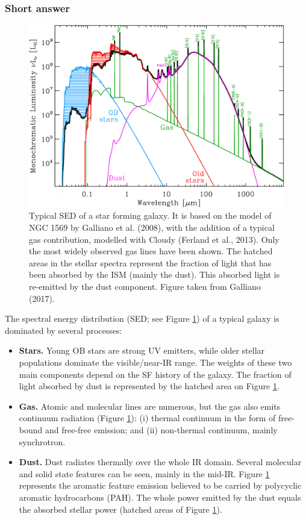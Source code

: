 \documentclass[a4paper,10pt]{article}
\begin{document}
\subsubsection{Short answer}

\begin{figure}[h]
    \centering
    \includegraphics[width=14cm]{figures/GalaxySED.jpg}
    \caption{\footnotesize{Typical SED of a star forming galaxy. It is based on the model of NGC 1569 by Galliano et al. (2008), with the addition of a typical gas contribution, modelled with Cloudy (Ferland et al., 2013). Only the most widely observed gas lines have been shown. The hatched areas in the stellar spectra represent the fraction of light that has been absorbed by the ISM (mainly the dust). This absorbed light is re-emitted by the dust component. Figure taken from Galliano (2017).}}
    \label{fig:galaxySED}
\end{figure}

{\noindent}The spectral energy distribution (SED; see Figure \ref{fig:galaxySED}) of a typical galaxy is dominated by several processes:

\begin{itemize}
    \item \textbf{Stars.} Young OB stars are strong UV emitters, while older stellar populations dominate the visible/near-IR range. The weights of these two main components depend on the SF history of the galaxy. The fraction of light absorbed by dust is represented by the hatched area on Figure \ref{fig:galaxySED}.
    \item \textbf{Gas.} Atomic and molecular lines are numerous, but the gas also emits continuum radiation (Figure \ref{fig:galaxySED}): (i) thermal continuum in the form of free-bound and free-free emission; and (ii) non-thermal continuum, mainly synchrotron.
    \item \textbf{Dust.} Dust radiates thermally over the whole IR domain. Several molecular and solid state features can be seen, mainly in the mid-IR. Figure \ref{fig:galaxySED} represents the aromatic feature emission believed to be carried by polycyclic aromatic hydrocarbons (PAH). The whole power emitted by the dust equals the absorbed stellar power (hatched areas of Figure \ref{fig:galaxySED}).
\end{itemize}
\end{document}
